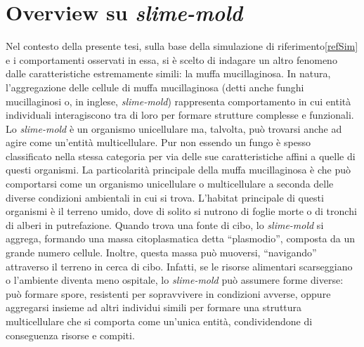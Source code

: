 \section{Overview su \textit{slime-mold}}
Nel contesto della presente tesi, sulla base della simulazione di riferimento\ref{refSim} e i comportamenti osservati in essa, si è scelto di indagare un altro 
fenomeno dalle caratteristiche estremamente simili: la muffa mucillaginosa.
In natura, l'aggregazione delle cellule di muffa mucillaginosa (detti anche funghi mucillaginosi o, in inglese, \textit{slime-mold}) rappresenta
comportamento in cui entità individuali interagiscono tra di loro per formare strutture complesse e funzionali. 
Lo \textit{slime-mold} è un organismo unicellulare ma, talvolta, può trovarsi anche ad agire come un'entità multicellulare. 
Pur non essendo un fungo è spesso classificato nella stessa categoria per via delle sue caratteristiche affini a quelle di questi organismi.
La particolarità principale della muffa mucillaginosa è che può comportarsi come un organismo unicellulare o multicellulare a seconda delle diverse 
condizioni ambientali in cui si trova.
L'habitat principale di questi organismi è il terreno umido, dove di solito si nutrono di foglie morte o di tronchi di alberi in putrefazione.
Quando trova una fonte di cibo, lo \textit{slime-mold} si aggrega, formando una massa citoplasmatica detta ``plasmodio'', composta da un grande numero cellule. Inoltre,
questa massa può muoversi, ``navigando'' attraverso il terreno in cerca di cibo.
Infatti, se le risorse alimentari scarseggiano o l'ambiente diventa meno ospitale, lo \textit{slime-mold} può assumere forme diverse: può formare spore, 
resistenti per sopravvivere in condizioni avverse, oppure aggregarsi insieme ad altri individui simili per formare una struttura multicellulare
che si comporta come un'unica entità, condividendone di conseguenza risorse e compiti.

